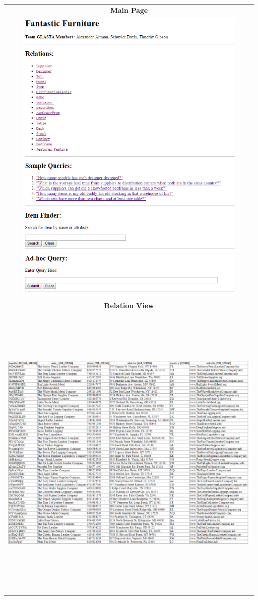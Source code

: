 \documentclass[american,extrafontsizes,12pt,portrait,letterpaper,oneside,onecolumn,final]{memoir}
\begin{document}
\begin{longtabu}{|c|}
\firsthline
\textbf{Main Page}\\*
\includegraphics[keepaspectratio=true,width=40em,height=40em]{snapshots/frontpage.png}\\
\hline
\textbf{Relation View}\\*
\includegraphics[keepaspectratio=true,width=40em,height=40em]{snapshots/sampleRelation.png}\\

\end{longtabu}
\end{document}
